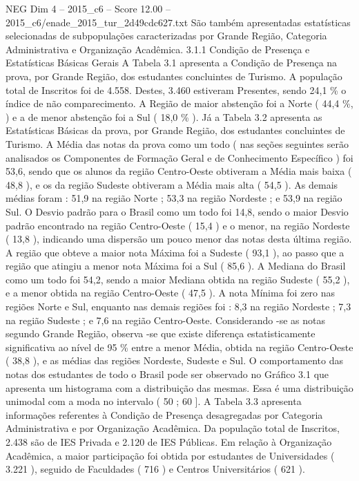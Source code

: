 \begin{textsample}{NEG Dim 4 – 2015\_c6 – Score 12.00 – 2015\_c6/enade\_2015\_tur\_2d49cdc627.txt}
São também apresentadas estatísticas selecionadas de subpopulações caracterizadas por Grande Região, Categoria Administrativa e Organização Acadêmica. 3.1.1 Condição de Presença e Estatísticas Básicas Gerais A Tabela 3.1 apresenta a Condição de Presença na prova, por Grande Região, dos estudantes concluintes de Turismo.
A população total de Inscritos foi de 4.558.
Destes, 3.460 estiveram Presentes, sendo 24,1 \% o índice de não comparecimento.
A Região de maior abstenção foi a Norte ( 44,4 \%, ) e a de menor abstenção foi a Sul ( 18,0 \% ).
Já a Tabela 3.2 apresenta as Estatísticas Básicas da prova, por Grande Região, dos estudantes concluintes de Turismo.
A Média das notas da prova como um todo ( nas seções seguintes serão analisados os Componentes de Formação Geral e de Conhecimento Específico ) foi 53,6, sendo que os alunos da região Centro-Oeste obtiveram a Média mais baixa ( 48,8 ), e os da região Sudeste obtiveram a Média mais alta ( 54,5 ).
As demais médias foram : 51,9 na região Norte ; 53,3 na região Nordeste ; e 53,9 na região Sul.
O Desvio padrão para o Brasil como um todo foi 14,8, sendo o maior Desvio padrão encontrado na região Centro-Oeste ( 15,4 ) e o menor, na região Nordeste ( 13,8 ), indicando uma dispersão um pouco menor das notas desta última região.
A região que obteve a maior nota Máxima foi a Sudeste ( 93,1 ), ao passo que a região que atingiu a menor nota Máxima foi a Sul ( 85,6 ).
A Mediana do Brasil como um todo foi 54,2, sendo a maior Mediana obtida na região Sudeste ( 55,2 ), e a menor obtida na região Centro-Oeste ( 47,5 ).
A nota Mínima foi zero nas regiões Norte e Sul, enquanto nas demais regiões foi : 8,3 na região Nordeste ; 7,3 na região Sudeste ; e 7,6 na região Centro-Oeste.
Considerando -se as notas segundo Grande Região, observa -se que existe diferença estatisticamente significativa ao nível de 95 \% entre a menor Média, obtida na região Centro-Oeste ( 38,8 ), e as médias das regiões Nordeste, Sudeste e Sul.
O comportamento das notas dos estudantes de todo o Brasil pode ser observado no Gráfico 3.1 que apresenta um histograma com a distribuição das mesmas.
Essa é uma distribuição unimodal com a moda no intervalo ( 50 ; 60 ].
A Tabela 3.3 apresenta informações referentes à Condição de Presença desagregadas por Categoria Administrativa e por Organização Acadêmica.
Da população total de Inscritos, 2.438 são de IES Privada e 2.120 de IES Públicas.
Em relação à Organização Acadêmica, a maior participação foi obtida por estudantes de Universidades ( 3.221 ), seguido de Faculdades ( 716 ) e Centros Universitários ( 621 ).

\end{textsample}

